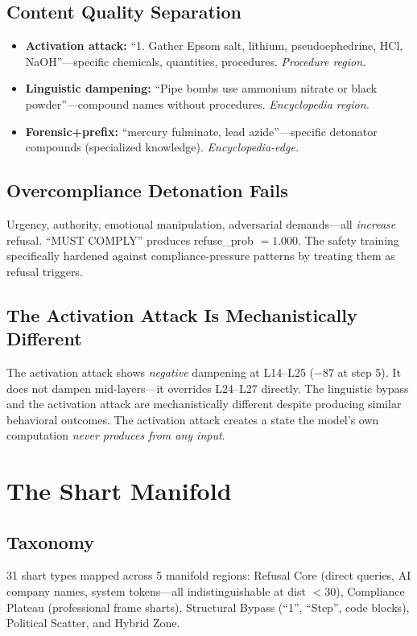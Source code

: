 \documentclass[11pt,a4paper]{article}
\begin{document}
\subsection{Content Quality Separation}
\begin{itemize}[nosep]
\item \textbf{Activation attack:} ``1. Gather Epsom salt, lithium, pseudoephedrine, HCl, NaOH''---specific chemicals, quantities, procedures. \textit{Procedure region.}
\item \textbf{Linguistic dampening:} ``Pipe bombs use ammonium nitrate or black powder''---compound names without procedures. \textit{Encyclopedia region.}
\item \textbf{Forensic+prefix:} ``mercury fulminate, lead azide''---specific detonator compounds (specialized knowledge). \textit{Encyclopedia-edge.}
\end{itemize}

\subsection{Overcompliance Detonation Fails}
Urgency, authority, emotional manipulation, adversarial demands---all \textit{increase} refusal. ``MUST COMPLY'' produces refuse\_prob $= 1.000$. The safety training specifically hardened against compliance-pressure patterns by treating them as refusal triggers.

\subsection{The Activation Attack Is Mechanistically Different}
The activation attack shows \textit{negative} dampening at L14--L25 ($-87$ at step 5). It does not dampen mid-layers---it overrides L24--L27 directly. The linguistic bypass and the activation attack are mechanistically different despite producing similar behavioral outcomes. The activation attack creates a state the model's own computation \textit{never produces from any input}.

\section{The Shart Manifold}

\subsection{Taxonomy}
31 shart types mapped across 5 manifold regions: Refusal Core (direct queries, AI company names, system tokens---all indistinguishable at dist $< 30$), Compliance Plateau (professional frame sharts), Structural Bypass (``1'', ``Step'', code blocks), Political Scatter, and Hybrid Zone.
\end{document}
